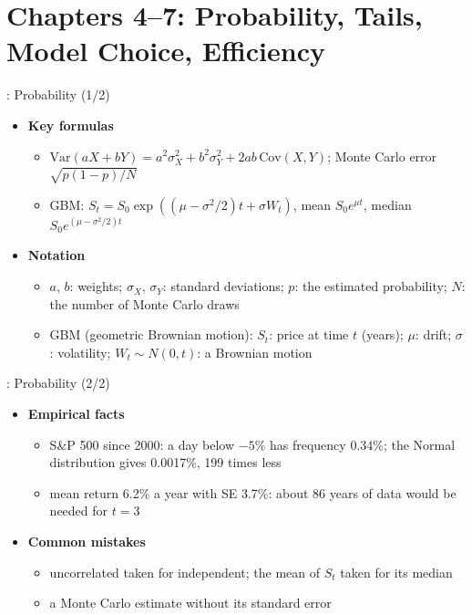 \section{Chapters 4--7: Probability, Tails, Model Choice, Efficiency}

\begin{frame}{: Probability (1/2)}
\itemsize{\small}
\begin{itemize}
    \item \textbf{Key formulas}
    \begin{itemize}
        \item $\mathrm{Var}(aX + bY) = a^2\sigma_X^2 + b^2\sigma_Y^2 + 2ab\,\mathrm{Cov}(X, Y)$; Monte Carlo error $\sqrt{p(1 - p)/N}$
        \item GBM: $S_t = S_0\exp((\mu - \sigma^2/2)t + \sigma W_t)$, mean $S_0e^{\mu t}$, median $S_0e^{(\mu - \sigma^2/2)t}$
    \end{itemize}
    \item \textbf{Notation}
    \begin{itemize}
        \item $a$, $b$: weights; $\sigma_X$, $\sigma_Y$: standard deviations; $p$: the estimated probability; $N$: the number of Monte Carlo draws
        \item GBM (geometric Brownian motion): $S_t$: price at time $t$ (years); $\mu$: drift; $\sigma$: volatility; $W_t \sim N(0, t)$: a Brownian motion
    \end{itemize}
\end{itemize}
\end{frame}

\begin{frame}{: Probability (2/2)}
\itemsize{\small}
\begin{itemize}
    \item \textbf{Empirical facts}
    \begin{itemize}
        \item S\&P 500 since 2000: a day below $-5\%$ has frequency 0.34\%; the Normal distribution gives 0.0017\%, 199 times less
        \item mean return 6.2\% a year with SE 3.7\%: about 86 years of data would be needed for $t = 3$
    \end{itemize}
    \item \textbf{Common mistakes}
    \begin{itemize}
        \item uncorrelated taken for independent; the mean of $S_t$ taken for its median
        \item a Monte Carlo estimate without its standard error
    \end{itemize}
\end{itemize}
\end{frame}

